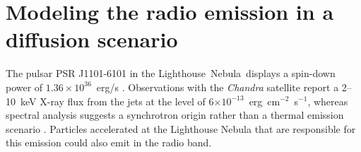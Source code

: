 \documentclass[letter]{aa}
\newcommand{\lneb}{Lighthouse~Nebula~}
\begin{document}
            \section{Modeling the radio emission in a diffusion scenario}
                                \label{section:model}



The pulsar PSR J1101-6101 in the \lneb displays a spin-down power of $1.36 \times 10^{36}$~erg/s \citep{Halpern2014}. Observations with the \textit{Chandra} satellite report a 2--10~keV X-ray flux from the jets at the level of 6$\times 10^{-13}$~erg~cm$^{-2}$~s$^{-1}$, whereas spectral analysis suggests a synchrotron origin rather than a thermal emission scenario \citep{Pavan2014}. Particles accelerated at the Lighthouse Nebula that are responsible for this emission could also emit in the radio band. 
%
\end{document}

